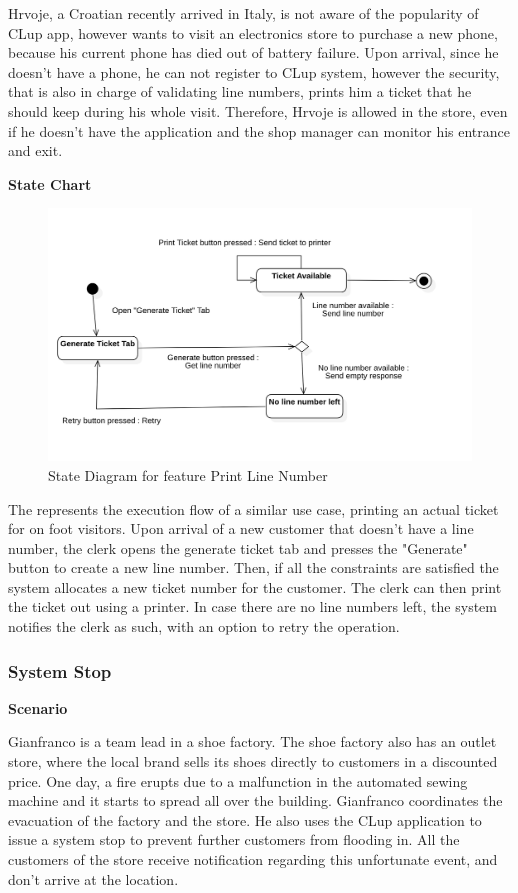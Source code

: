 Hrvoje, a Croatian recently arrived in Italy, is not aware of the popularity of CLup app, however wants to visit an electronics store to purchase a new phone, because his current phone has died out of battery failure.
Upon arrival, since he doesn't have a phone, he can not register to CLup system, however the security, that is also in charge of validating line numbers, prints him a ticket that he should keep during his whole visit.
Therefore, Hrvoje is allowed in the store, even if he doesn't have the application and the shop manager can monitor his entrance and exit.

\textbf{State Chart}

\begin{figure}[H]
    \centering
    \includegraphics[height=0.4\textwidth]{Images/StateCharts/PrintTicket.png}
    \caption{State Diagram for feature Print Line Number}
    \label{fig:SDPrintLine}
\end{figure}

The  represents the execution flow of a similar use case, printing an actual ticket for on foot visitors.
Upon arrival of a new customer that doesn't have a line number, the clerk opens the generate ticket tab and presses the "Generate" button to create a new line number.
Then, if all the constraints are satisfied the system allocates a new ticket number for the customer.
The clerk can then print the ticket out using a printer.
In case there are no line numbers left, the system notifies the clerk as such, with an option to retry the operation.

\subsubsection{System Stop}

\textbf{Scenario}

Gianfranco is a team lead in a shoe factory.
The shoe factory also has an outlet store, where the local brand sells its shoes directly to customers in a discounted price.
One day, a fire erupts due to a malfunction in the automated sewing machine and it starts to spread all over the building.
Gianfranco coordinates the evacuation of the factory and the store.
He also uses the CLup application to issue a system stop to prevent further customers from flooding in.
All the customers of the store receive notification regarding this unfortunate event, and don't arrive at the location.

